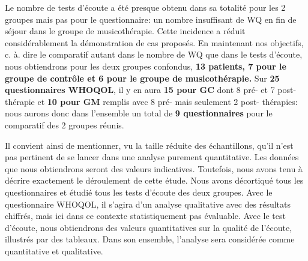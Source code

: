     
     
     Le nombre de tests d'écoute a été presque obtenu dans sa totalité pour les 2 groupes mais 
     pas 
     pour le questionnaire: un nombre insuffisant  de WQ en fin de 
     séjour dans le groupe de musicothérapie.
     Cette  incidence a réduit considérablement la démonstration de cas proposés.
     En maintenant nos objectifs, c. à. dire  le comparatif autant  dans le nombre de WQ que dans le  tests 
      d'écoute, 
     nous obtiendrons pour  les deux groupes confondus, \textbf{13 patients, 7 pour le groupe de contrôle 
     et 
     	6 pour 
     	le groupe de musicothérapie.}
     Sur \textbf{25 questionnaires WHOQOL}, il y en aura  \textbf{15 pour GC} dont 8 pré-
     et 7 post-thérapie et  \textbf{10 pour GM} remplis
     avec 8  pré- mais seulement 2
     post- thérapies:  nous aurons donc dans l'ensemble un total de \textbf{9 questionnaires} pour le
     comparatif des 2 groupes réunis.
   
   
   
   Il convient ainsi de mentionner, vu la taille réduite des échantillons, qu'il n'est pas
   pertinent de se lancer dans une analyse purement
   quantitative.
   Les données que nous obtiendrons seront des valeurs indicatives.
   Toutefois, nous avons tenu à décrire exactement le déroulement de cette étude. Nous avons 
   décortiqué 
   tous les questionnaires et étudié tous les tests d'écoute des deux groupes.
   Avec le questionnaire 
   WHOQOL,  il  s'agira d'un analyse qualitative avec des résultats chiffrés, mais ici dans ce contexte
   statistiquement pas évaluable. 
   Avec le test d'écoute, nous obtiendrons des valeurs quantitatives sur la qualité de l'écoute, illustrés 
   par 
   des tableaux.
   Dans son ensemble, l'analyse sera considérée comme quantitative  et qualitative.
   
   
   
